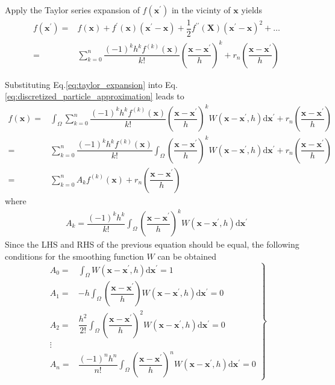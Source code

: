 \documentclass[letterpaper,12pt]{article}
\numberwithin{equation}{section}
\begin{document}
Apply the Taylor series expansion of $f(\mathbf{x}^\prime)$ in the vicinty of $\mathbf{x}$ yields
\begin{align}
    f(\mathbf{x}^\prime) =& f(\mathbf{x}) + f^\prime(\mathbf{x}) (\mathbf{x}^\prime  - \mathbf{x}) + \dfrac12 f^{\prime\prime}(\mathbf{X}) (\mathbf{x}^\prime  - \mathbf{x})^2 + \dots \nonumber \\
    =& \sum_{k=0}^n \dfrac{(-1)^k h^k f^{(k)}(\mathbf{x})}{k!} \left( \dfrac{\mathbf{x} - \mathbf{x}^\prime}{h} \right)^k + r_n\left( \dfrac{\mathbf{x} - \mathbf{x}^\prime}{h} \right) \label{eq:taylor_expansion}
\end{align}

Substituting Eq.\ref{eq:taylor_expansion} into Eq.\ref{eq:discretized_particle_approximation} leads to
\begin{align}
    f(\mathbf{x}) =& \int_{\Omega} \sum_{k=0}^n \dfrac{(-1)^k h^k f^{(k)}(\mathbf{x})}{k!} \left( \dfrac{\mathbf{x} - \mathbf{x}^\prime}{h} \right)^k W(\mathbf{x} - \mathbf{x}^\prime, h) \mathrm{d} \mathbf{x}^\prime + r_n\left( \dfrac{\mathbf{x} - \mathbf{x}^\prime}{h} \right) \nonumber \\
    =& \sum_{k=0}^n \dfrac{(-1)^k h^k f^{(k)}(\mathbf{x})}{k!} \int_{\Omega} \left( \dfrac{\mathbf{x} - \mathbf{x}^\prime}{h} \right)^k W(\mathbf{x} - \mathbf{x}^\prime, h) \mathrm{d} \mathbf{x}^\prime + r_n\left( \dfrac{\mathbf{x} - \mathbf{x}^\prime}{h} \right) \nonumber \\
    =& \sum_{k=0}^n A_k f^{(k)}(\mathbf{x}) + r_n\left( \dfrac{\mathbf{x} - \mathbf{x}^\prime}{h} \right)
\end{align}
where
\begin{align}
    A_k = \dfrac{(-1)^k h^k }{k!} \int_{\Omega} \left( \dfrac{\mathbf{x} - \mathbf{x}^\prime}{h} \right)^k W(\mathbf{x} - \mathbf{x}^\prime, h) \mathrm{d} \mathbf{x}^\prime
\end{align}
Since the LHS and RHS of the previous equation should be equal, the following conditions for the smoothing function $W$ can be obtained
\begin{equation}
    \left.
    \begin{aligned}
        A_0 =& \int_{\Omega} W(\mathbf{x} - \mathbf{x}^\prime, h) \mathrm{d} \mathbf{x}^\prime = 1 \\
        A_1 =& -h \int_{\Omega} \left( \dfrac{\mathbf{x} - \mathbf{x}^\prime}{h} \right) W(\mathbf{x} - \mathbf{x}^\prime, h) \mathrm{d} \mathbf{x}^\prime = 0 \\
        A_2 =& \dfrac{h^2}{2!} \int_{\Omega} \left( \dfrac{\mathbf{x} - \mathbf{x}^\prime}{h} \right)^2 W(\mathbf{x} - \mathbf{x}^\prime, h) \mathrm{d} \mathbf{x}^\prime = 0 \\
        \vdots & \\
        A_n =& \dfrac{(-1)^n h^n}{n!} \int_{\Omega} \left( \dfrac{\mathbf{x} - \mathbf{x}^\prime}{h} \right)^n W(\mathbf{x} - \mathbf{x}^\prime, h) \mathrm{d} \mathbf{x}^\prime = 0
    \end{aligned}
    \right\}
\end{equation}
\end{document}
